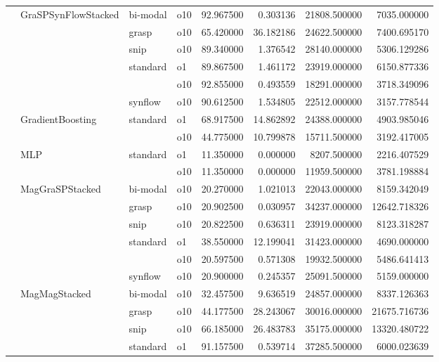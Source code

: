 \begin{longtable}{llllrrrr}
      & GraSPSynFlowStacked & bi-modal & o10 &  92.967500 &   0.303136 &     21808.500000 &   7035.000000 \\
      &     & grasp & o10 &  65.420000 &  36.182186 &     24622.500000 &   7400.695170 \\
      &     & snip & o10 &  89.340000 &   1.376542 &     28140.000000 &   5306.129286 \\
      &     & standard & o1 &  89.867500 &   1.461172 &     23919.000000 &   6150.877336 \\
      &     &         & o10 &  92.855000 &   0.493559 &     18291.000000 &   3718.349096 \\
      &     & synflow & o10 &  90.612500 &   1.534805 &     22512.000000 &   3157.778544 \\
      & GradientBoosting & standard & o1 &  68.917500 &  14.862892 &     24388.000000 &   4903.985046 \\
      &     &         & o10 &  44.775000 &  10.799878 &     15711.500000 &   3192.417005 \\
      & MLP & standard & o1 &  11.350000 &   0.000000 &      8207.500000 &   2216.407529 \\
      &     &         & o10 &  11.350000 &   0.000000 &     11959.500000 &   3781.198884 \\
      & MagGraSPStacked & bi-modal & o10 &  20.270000 &   1.021013 &     22043.000000 &   8159.342049 \\
      &     & grasp & o10 &  20.902500 &   0.030957 &     34237.000000 &  12642.718326 \\
      &     & snip & o10 &  20.822500 &   0.636311 &     23919.000000 &   8123.318287 \\
      &     & standard & o1 &  38.550000 &  12.199041 &     31423.000000 &   4690.000000 \\
      &     &         & o10 &  20.597500 &   0.571308 &     19932.500000 &   5486.641413 \\
      &     & synflow & o10 &  20.900000 &   0.245357 &     25091.500000 &   5159.000000 \\
      & MagMagStacked & bi-modal & o10 &  32.457500 &   9.636519 &     24857.000000 &   8337.126363 \\
      &     & grasp & o10 &  44.177500 &  28.243067 &     30016.000000 &  21675.716736 \\
      &     & snip & o10 &  66.185000 &  26.483783 &     35175.000000 &  13320.480722 \\
      &     & standard & o1 &  91.157500 &   0.539714 &     37285.500000 &   6000.023639 \\

\end{longtable}

